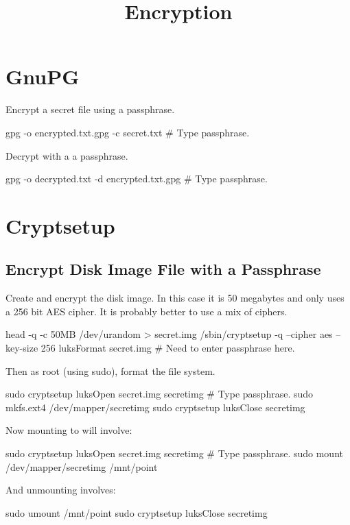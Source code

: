 
\title{Encryption}
\date{}



\tableofcontents


\section{GnuPG}

Encrypt a secret file using a passphrase.
\begin{code}
gpg -o encrypted.txt.gpg -c secret.txt
# Type passphrase.
\end{code}

Decrypt with a a passphrase.
\begin{code}
gpg -o decrypted.txt -d encrypted.txt.gpg
# Type passphrase.
\end{code}


\section{Cryptsetup}

\subsection{Encrypt Disk Image File with a Passphrase}

Create and encrypt the disk image.
In this case it is 50 megabytes and only uses a 256 bit AES cipher.
It is probably better to use a mix of ciphers.
\begin{code}
head -q -c 50MB /dev/urandom > secret.img
/sbin/cryptsetup -q --cipher aes --key-size 256 luksFormat secret.img
# Need to enter passphrase here.
\end{code}
Then as root (using sudo), format the file system.
\begin{code}
sudo cryptsetup luksOpen secret.img secretimg
# Type passphrase.
sudo mkfs.ext4 /dev/mapper/secretimg
sudo cryptsetup luksClose secretimg
\end{code}

Now mounting to  will involve:
\begin{code}
sudo cryptsetup luksOpen secret.img secretimg
# Type passphrase.
sudo mount /dev/mapper/secretimg /mnt/point
\end{code}

And unmounting involves:
\begin{code}
sudo umount /mnt/point
sudo cryptsetup luksClose secretimg
\end{code}

